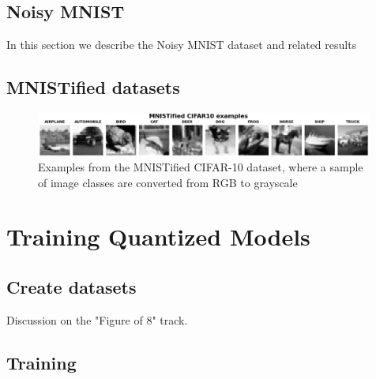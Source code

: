 

\subsection{Noisy MNIST}

In this section we describe the Noisy MNIST dataset and related results

\subsection{MNISTified datasets}

\begin{figure}[h]
\centering
\includegraphics[width=0.99\textwidth]{Figures/Results/mnistified_cifar10.png}
\caption{Examples from the MNISTified CIFAR-10 dataset, where a sample of image classes are converted from RGB to grayscale}
\label{fig:mnistified_cifar10}
\end{figure}


\section{Training Quantized Models}

\subsection{Create datasets}

Discussion on the "Figure of 8" track.

\subsection{Training}






